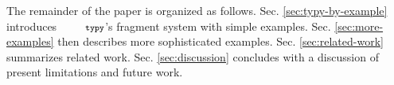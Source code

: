 \documentclass[10pt]{sigplanconf}
\newcommand{\typy}{\texttt{\footnotesize typy}}
\begin{document}
The remainder of the paper is organized as follows. 
Sec. \ref{sec:typy-by-example} introduces $\typy$'s fragment system with simple examples. Sec. \ref{sec:more-examples} then describes more sophisticated examples. %
Sec. \ref{sec:related-work} summarizes related work.  Sec. \ref{sec:discussion} concludes with a discussion of present limitations and future work.



\end{document}
